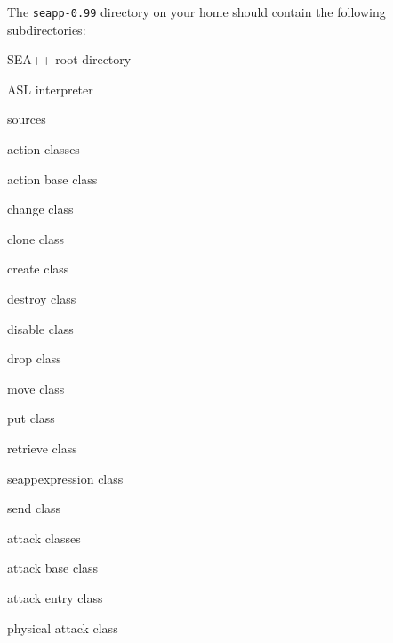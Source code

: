 The \texttt{seapp-0.99} directory on your home should contain the following subdirectories:
%
\begin{description}[noitemsep]
\item[] { SEA++ root directory}
	\item[] { ASL interpreter}
	\item[] { sources}
		\item[] { action classes}
			\item[] { action base class}
			\item[] { change class}
			\item[] { clone class}
			\item[] { create class}
			\item[] { destroy class}
			\item[] { disable class}
			\item[] { drop class}
			\item[] { move class}
			\item[] { put class}
			\item[] { retrieve class}
			\item[] { seappexpression class}
			\item[] { send class}
		\item[] { attack classes}
			\item[] { attack base class}
			\item[] { attack entry class}
			\item[] { physical attack class}

\end{description}
